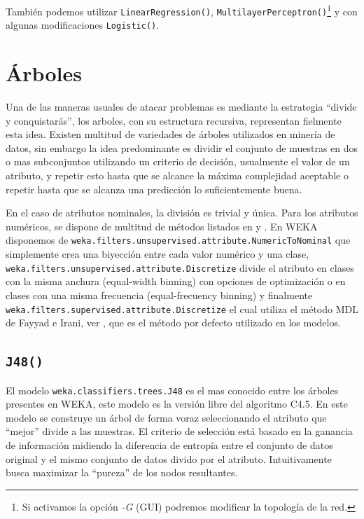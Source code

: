 \documentclass[10pt,a4paper]{article}
\begin{document}
También podemos utilizar \lstinline{LinearRegression()}, \lstinline{MultilayerPerceptron()}\footnote{Si activamos la opción \textit{-G} (GUI) podremos modificar la topología de la red.} y con algunas modificaciones \lstinline{Logistic()}.


\section{Árboles}
Una de las maneras usuales de atacar problemas es mediante la estrategia ``divide y conquistarás'', los arboles, con su estructura recursiva, representan fielmente esta idea. Existen multitud de variedades de árboles utilizados en minería de datos, sin embargo la idea predominante es dividir el conjunto de muestras en dos o mas subconjuntos utilizando un criterio de decisión, usualmente el valor de un atributo, y repetir esto hasta que se alcance la máxima complejidad aceptable o repetir hasta que se alcanza una predicción lo suficientemente buena.

En el caso de atributos nominales, la división es trivial y única. Para los atributos numéricos, se dispone de multitud de métodos listados en \cite{kotsiantis2006discretization} y \cite{dougherty1995supervised}. En WEKA disponemos de \lstinline{weka.filters.unsupervised.attribute.NumericToNominal} que simplemente crea una biyección entre cada valor numérico y una clase, \lstinline{weka.filters.unsupervised.attribute.Discretize} divide el atributo en clases con la misma anchura (equal-width binning) con opciones de optimización o en clases con una misma frecuencia (equal-frecuency binning) y finalmente \lstinline{weka.filters.supervised.attribute.Discretize} el cual utiliza el método MDL de Fayyad e Irani, ver \cite{irani1993multi}, que es el método por defecto utilizado en los modelos.

\subsection{\texorpdfstring{\lstinline{J48()}}{J48()}}
El modelo \lstinline{weka.classifiers.trees.J48} es el mas conocido entre los árboles presentes en WEKA, este modelo es la versión libre del algoritmo C4.5. En este modelo se construye un árbol de forma voraz seleccionando el atributo que ``mejor'' divide a las muestras. El criterio de selección está basado en la ganancia de información midiendo la diferencia de entropía entre el conjunto de datos original y el mismo conjunto de datos divido por el atributo. Intuitivamente busca maximizar la ``pureza'' de los nodos resultantes.
\end{document}

